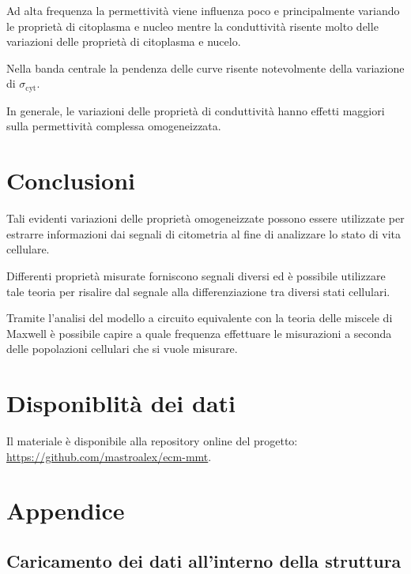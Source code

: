 Ad alta frequenza la permettività viene influenza poco e principalmente variando le proprietà di citoplasma e nucleo mentre la conduttività risente molto delle variazioni delle proprietà di citoplasma e nucelo.

Nella banda centrale la pendenza delle curve risente notevolmente della variazione di $\sigma_{\operatorname{cyt}}$.

In generale, le variazioni delle proprietà di conduttività hanno effetti maggiori sulla permettività complessa omogeneizzata.
	
	
\section{Conclusioni}


Tali evidenti variazioni delle proprietà omogeneizzate possono essere utilizzate per estrarre informazioni dai segnali di citometria al fine di analizzare lo stato di vita cellulare.

Differenti proprietà misurate forniscono segnali diversi ed è possibile utilizzare tale teoria per risalire dal segnale alla differenziazione tra diversi stati cellulari. 

Tramite l'analisi del modello a circuito equivalente con la teoria delle miscele di Maxwell è possibile capire a quale frequenza effettuare le misurazioni a seconda delle popolazioni cellulari che si vuole misurare. 


\raggedbottom


\raggedbottom
\pagebreak
\section*{Disponiblità dei dati}

Il materiale è disponibile alla repository online del progetto: \url{https://github.com/mastroalex/ecm-mmt}.

\printbibliography[title=Riferimenti]

\clearpage
\onecolumn
\section*{Appendice}

\subsection*{Caricamento dei dati all'interno della struttura}

